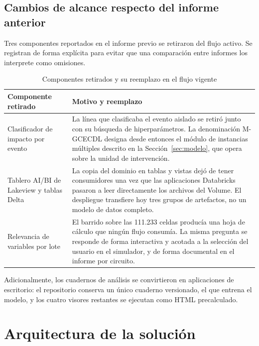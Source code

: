 \documentclass[11pt,a4paper]{article}
\begin{document}
\subsection{Cambios de alcance respecto del informe anterior}

Tres componentes reportados en el informe previo se retiraron del flujo activo. Se registran
de forma explícita para evitar que una comparación entre informes los interprete como
omisiones.

\begin{table}[H]
\centering
\caption{Componentes retirados y su reemplazo en el flujo vigente}
\label{tab:retiros}
\small
\begin{tabularx}{\textwidth}{L{4.4cm} X}
\toprule
\textbf{Componente retirado} & \textbf{Motivo y reemplazo} \\
\midrule
Clasificador de impacto por evento &
La línea que clasificaba el evento aislado se retiró junto con su búsqueda de
hiperparámetros. La denominación M-GCECDL designa desde entonces el módulo de instancias
múltiples descrito en la Sección~\ref{sec:modelo}, que opera sobre la unidad de
intervención. \\
\addlinespace
Tablero AI/BI de Lakeview y tablas Delta &
La copia del dominio en tablas y vistas dejó de tener consumidores una vez que las
aplicaciones Databricks pasaron a leer directamente los archivos del Volume. El despliegue
transfiere hoy tres grupos de artefactos, no un modelo de datos completo. \\
\addlinespace
Relevancia de variables por lote &
El barrido sobre las 111.233 celdas producía una hoja de cálculo que ningún flujo consumía.
La misma pregunta se responde de forma interactiva y acotada a la selección del usuario en el
simulador, y de forma documental en el informe por circuito. \\
\bottomrule
\end{tabularx}
\end{table}

Adicionalmente, los cuadernos de análisis se convirtieron en aplicaciones de escritorio: el
repositorio conserva un único cuaderno versionado, el que entrena el modelo, y los cuatro
visores restantes se ejecutan como HTML precalculado.

\section{Arquitectura de la solución}
\label{sec:arquitectura}
\end{document}

